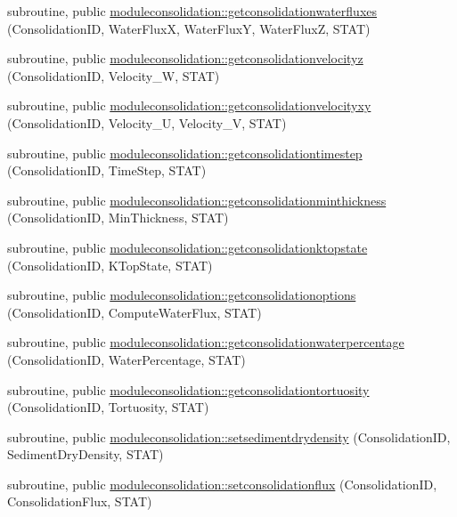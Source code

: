 \begin{DoxyCompactItemize}
\item 
subroutine, public \mbox{\hyperlink{namespacemoduleconsolidation_ab2cf2636db758f412f7c627b38eb6231}{moduleconsolidation\+::getconsolidationwaterfluxes}} (Consolidation\+ID, Water\+FluxX, Water\+FluxY, Water\+FluxZ, S\+T\+AT)
\item 
subroutine, public \mbox{\hyperlink{namespacemoduleconsolidation_a1a8c6ae3e68c283ceaaa0a81fb8f531b}{moduleconsolidation\+::getconsolidationvelocityz}} (Consolidation\+ID, Velocity\+\_\+W, S\+T\+AT)
\item 
subroutine, public \mbox{\hyperlink{namespacemoduleconsolidation_ad474911e58923dc9beb19e05548a5073}{moduleconsolidation\+::getconsolidationvelocityxy}} (Consolidation\+ID, Velocity\+\_\+U, Velocity\+\_\+V, S\+T\+AT)
\item 
subroutine, public \mbox{\hyperlink{namespacemoduleconsolidation_a529ccec5bab61ec53a0993230d6bb49c}{moduleconsolidation\+::getconsolidationtimestep}} (Consolidation\+ID, Time\+Step, S\+T\+AT)
\item 
subroutine, public \mbox{\hyperlink{namespacemoduleconsolidation_a9166ecea6df370e3decee58c70761e72}{moduleconsolidation\+::getconsolidationminthickness}} (Consolidation\+ID, Min\+Thickness, S\+T\+AT)
\item 
subroutine, public \mbox{\hyperlink{namespacemoduleconsolidation_ace4ba590047f774affd5abf5e15b7e41}{moduleconsolidation\+::getconsolidationktopstate}} (Consolidation\+ID, K\+Top\+State, S\+T\+AT)
\item 
subroutine, public \mbox{\hyperlink{namespacemoduleconsolidation_a37aecd6313d74a8d082f6b77cd63bfef}{moduleconsolidation\+::getconsolidationoptions}} (Consolidation\+ID, Compute\+Water\+Flux, S\+T\+AT)
\item 
subroutine, public \mbox{\hyperlink{namespacemoduleconsolidation_ab90e8e4b9e87d2f8313a0f2860b3d4c8}{moduleconsolidation\+::getconsolidationwaterpercentage}} (Consolidation\+ID, Water\+Percentage, S\+T\+AT)
\item 
subroutine, public \mbox{\hyperlink{namespacemoduleconsolidation_a6f6333d1cd3299be92039f6e03e3b5b8}{moduleconsolidation\+::getconsolidationtortuosity}} (Consolidation\+ID, Tortuosity, S\+T\+AT)
\item 
subroutine, public \mbox{\hyperlink{namespacemoduleconsolidation_a79a5986057fbc83932d56bb8bfcf6b3b}{moduleconsolidation\+::setsedimentdrydensity}} (Consolidation\+ID, Sediment\+Dry\+Density, S\+T\+AT)
\item 
subroutine, public \mbox{\hyperlink{namespacemoduleconsolidation_a40ac455c6e9cb9d5dfa436553c29c193}{moduleconsolidation\+::setconsolidationflux}} (Consolidation\+ID, Consolidation\+Flux, S\+T\+AT)

\end{DoxyCompactItemize}
